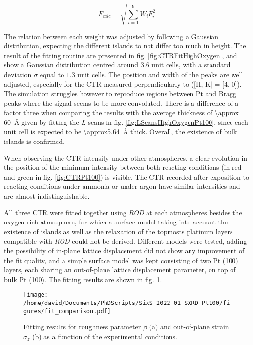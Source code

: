 \begin{equation}
    F_{calc} = \sqrt{\sum_{i=1}^{9} W_i F_i^2}
    \label{eq:Fcalc}
\end{equation}

The relation between each weight was adjusted by following a Gaussian distribution, expecting the different islands to not differ too much in height.
The result of the fitting routine are presented in fig. \ref{fig:CTRFitHighOxygen}, and show a Gaussian distribution centred around $3.6$ unit cells, with a standard deviation $\sigma$ equal to $1.3$ unit cells.
The position and width of the  peaks are well adjusted, especially for the CTR measured perpendicularly to ([H, K] = [4, 0]).
The simulation struggles however to reproduce regions between Pt and  Bragg peaks where the signal seems to be more convoluted.
There is a difference of a factor three when comparing the results with the average thickness of \qty{\approx 60}{\angstrom} given by fitting the $L$-scans in fig. \ref{fig:LScansHighOxygenPt100}, since each unit cell is expected to be \qty{\approx5.64}{\angstrom} thick.
Overall, the existence of bulk  islands is confirmed.

When observing the CTR intensity under other atmospheres, a clear evolution in the position of the minimum intensity between both reacting conditions (in red and green in fig. \ref{fig:CTRPt100}) is visible.
The CTR recorded after exposition to reacting conditions under ammonia or under argon have similar intensities and are almost indistinguishable.

All three CTR were fitted together using \textit{ROD} at each atmospheres besides the oxygen rich atmosphere, for which a surface model taking into account the existence of  islands as well as the relaxation of the topmosts platinum layers compatible with \textit{ROD} could not be derived.
Different models were tested, adding the possibility of in-plane lattice displacement did not show any improvement of the fit quality, and a simple surface model was kept consisting of two Pt (100) layers, each sharing an out-of-plane lattice displacement parameter, on top of bulk Pt (100).
The fitting results are shown in fig. \ref{fig:CTRFit100}.

\begin{figure}[!htb]
    \centering
    \texttt{[image: /home/david/Documents/PhDScripts/SixS\_2022\_01\_SXRD\_Pt100/figures/fit\_comparison.pdf]}
    \caption{
        Fitting results for roughness parameter $\beta$ (a) and out-of-plane strain $\sigma_z$ (b) as a function of the experimental conditions.
    }
    \label{fig:CTRFit100}
\end{figure}

